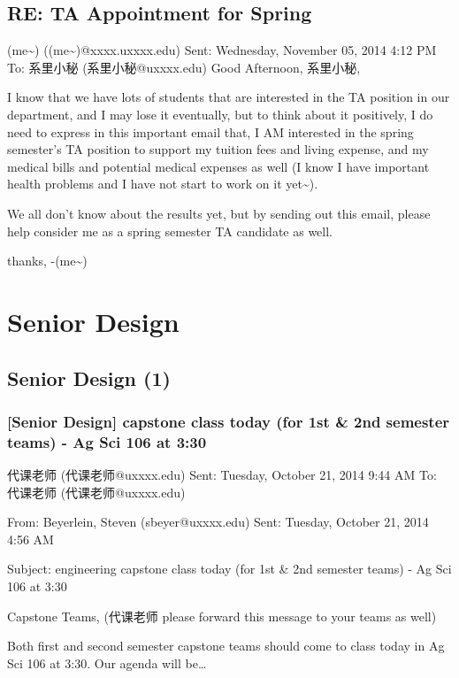 \documentclass[12pt]{book}
\begin{document}
\section{RE: TA Appointment for Spring}
\label{sec-17-2}
(me\textasciitilde{}) ((me\textasciitilde{})@xxxx.uxxxx.edu)
Sent:        Wednesday, November 05, 2014 4:12 PM
To:        
系里小秘 (系里小秘@uxxxx.edu)
Good Afternoon, 系里小秘, 

I know that we have lots of students that are interested in the TA position in our department, and I may lose it eventually, but to think about it positively, I do need to express in this important email that, I AM interested in the spring semester's TA position to support my tuition fees and living expense, and my medical bills and potential medical expenses as well (I know I have important health problems and I have not start to work on it yet\textasciitilde{}). 

We all don't know about the results yet, but by sending out this email, please help consider me as a spring semester TA candidate as well. 

thanks,
-(me\textasciitilde{})

\chapter{Senior Design}
\label{sec-18}
\section{Senior Design (1)}
\label{sec-18-1}
\subsection{[Senior Design] capstone class today (for 1st \& 2nd semester teams) - Ag Sci 106 at 3:30}
\label{sec-18-1-1}
代课老师 (代课老师@uxxxx.edu)
Sent:        Tuesday, October 21, 2014 9:44 AM
To:        
代课老师 (代课老师@uxxxx.edu)

From: Beyerlein, Steven (sbeyer@uxxxx.edu)
Sent: Tuesday, October 21, 2014 4:56 AM

Subject: engineering capstone class today (for 1st \& 2nd semester teams) - Ag Sci 106 at 3:30

Capstone Teams, (代课老师 please forward this message to your teams as well)

Both first and second semester capstone teams should come to class today in Ag Sci 106 at 3:30.  Our agenda will be\ldots{}
\end{document}
